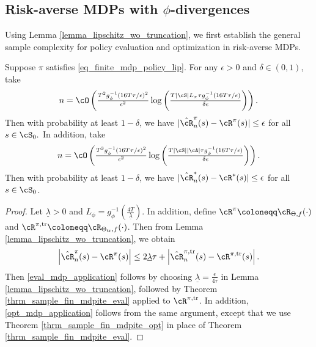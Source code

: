 \documentclass[9pt]{article}
\numberwithin{equation}{section}
\begin{document}
\subsection{Risk-averse MDPs with $\phi$-divergences}\label{subsec_application_mdp}

Using Lemma \ref{lemma_lipschitz_wo_truncation}, we first establish the general sample complexity for policy evaluation and optimization in risk-averse MDPs. 

\begin{theorem} \label{thrm_samp_comp_mdp_phi}
    Suppose $\pi$ satisfies \eqref{eq_finite_mdp_policy_lip}. For any $\epsilon > 0$ and $\delta \in (0,1)$, take
 \begin{align}\label{eval_mdp_application}
 n = \cO \left(\tfrac{T^2 g_\phi^{-1}(16T\tau/\epsilon)^2}{\epsilon^2} \log \left(\tfrac{T |\cS| L_\pi \tau g_\phi^{-1}(16T \tau /\epsilon)}{\delta \epsilon} \right)\right).
 \end{align}
 Then with probability at least $1-\delta$, we have $|\hat{\cR}_n^\pi(s) - \cR^{\pi}(s)| \leq \epsilon$ for all $s \in \cS_0.$
    In addition, take
   \begin{align}\label{opt_mdp_application}
   n = \cO \left(\tfrac{T^3 g_\phi^{-1}(16T \tau /\epsilon)^2}{\epsilon^2} \log \left(\tfrac{T |\cS| |\cA| \tau g_\phi^{-1}(16T \tau /\epsilon)}{\delta \epsilon} \right)\right).
   \end{align}
    Then with probability at least $1-\delta$, we have  $| \hat{\cR}^*_n(s)  -\cR^*(s) | \leq \epsilon $ for all $ s \in \cS_0$.
\end{theorem}
\begin{proof}
    Let $\underline{\lambda} > 0$ and $L_\phi = g_\phi^{-1}(\tfrac{4T}{\underline{\lambda}})$. 
    In addition,  define  $\cR^\pi  \coloneqq \cR_{\Theta, f} (\cdot)$ and $\cR^{\pi, \mathrm{tr}}  \coloneqq \cR_{\Theta_{\mathrm{tr}}, f} (\cdot)$.
Then from Lemma \ref{lemma_lipschitz_wo_truncation}, we obtain
    \begin{align*}
        \left|\hat{\cR}_n^\pi(s) - \cR^{\pi}(s)\right| \leq 2\underline{\lambda} \tau +  \left|\hat{{\cR}}_n^{\pi, \mathrm{tr}}(s) - {\cR}^{\pi, \mathrm{tr}}(s)\right|.
    \end{align*}
   Then \eqref{eval_mdp_application} follows by choosing $\underline{\lambda} = \tfrac{\epsilon}{4 \tau}$ in Lemma \ref{lemma_lipschitz_wo_truncation}, followed by  Theorem \ref{thrm_sample_fin_mdpite_eval}    applied 
   to $\cR^{\pi, \mathrm{tr}}$.  
    In addition, \eqref{opt_mdp_application} follows from the same argument, except that we use  Theorem \ref{thrm_sample_fin_mdpite_opt} in place of Theorem \ref{thrm_sample_fin_mdpite_eval}.
\end{proof}
\end{document}
